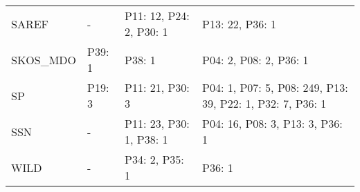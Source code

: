 \begin{tabular}{m{4cm}m{3cm}m{3cm}m{5cm}}
                  SAREF &              - &                           P11: 12, P24: 2, P30: 1 &                                           P13: 22, P36: 1 \\
               SKOS_MDO &         P39: 1 &                                            P38: 1 &                                    P04: 2, P08: 2, P36: 1 \\
                     SP &         P19: 3 &                                   P11: 21, P30: 3 & P04: 1, P07: 5, P08: 249, P13: 39, P22: 1, P32: 7, P36: 1 \\
                    SSN &              - &                           P11: 23, P30: 1, P38: 1 &                           P04: 16, P08: 3, P13: 3, P36: 1 \\
                   WILD &              - &                                    P34: 2, P35: 1 &                                                    P36: 1 \\
\bottomrule
\end{tabular}
